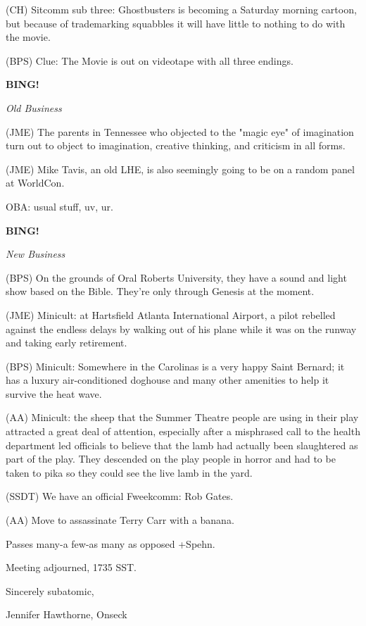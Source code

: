 \documentclass[12pt]{article}
\newcommand{\bing}{{\bf BING!} }
\newcommand{\goto}[1]{\bing \vskip 12pt \centerline{{\em{#1}}}}
\begin{document}
(CH) Sitcomm sub three: Ghostbusters is becoming a Saturday morning cartoon, but because of trademarking squabbles it will have little to nothing to do with the movie.

(BPS) Clue: The Movie is out on videotape with all three endings.

\goto{Old Business}

(JME) The parents in Tennessee who objected to the "magic eye" of imagination turn out to object to imagination, creative thinking, and criticism in all forms.

(JME) Mike Tavis, an old LHE, is also seemingly going to be on a random panel at WorldCon.

OBA: usual stuff, uv, ur.

\goto{New Business}

(BPS) On the grounds of Oral Roberts University, they have a sound and light show based on the Bible. They're only through Genesis at the moment.

(JME) Minicult: at Hartsfield Atlanta International Airport, a pilot rebelled against the endless delays by walking out of his plane while it was on the runway and taking early retirement.

(BPS) Minicult: Somewhere in the Carolinas is a very happy Saint Bernard; it has a luxury air-conditioned doghouse and many other amenities to help it survive the heat wave.

(AA) Minicult: the sheep that the Summer Theatre people are using in their play attracted a great deal of attention, especially after a misphrased call to the health department led officials to believe that the lamb had actually been slaughtered as part of the play. They descended on the play people in horror and had to be taken to pika so they could see the live lamb in the yard.

(SSDT) We have an official Fweekcomm: Rob Gates.

(AA) Move to assassinate Terry Carr with a banana.

Passes many-a few-as many as opposed +Spehn.

\vspace{12pt}

\noindent
Meeting adjourned, 1735 SST.

\vspace{18pt}

\centerline{Sincerely subatomic,}
\centerline{Jennifer Hawthorne, Onseck}
\end{document}
